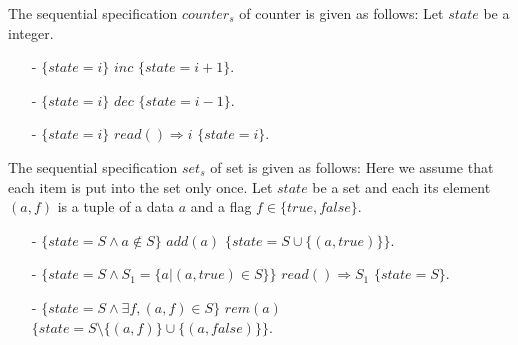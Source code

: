 {\begin{example}[Counter]
\label{definition:sequential specification of counter}
The sequential specification $\mathit{counter}_s$ of counter is given as follows: Let $\mathit{state}$ be a integer.

\begin{itemize}
\setlength{\itemsep}{0.5pt}
\item[-] $\{ \mathit{state} = i \}$ $\mathit{inc}$ $\{ \mathit{state} = i+1 \}$.
\item[-] $\{ \mathit{state} = i \}$ $\mathit{dec}$ $\{ \mathit{state} = i-1 \}$.
\item[-] $\{ \mathit{state} = i \}$ $\mathit{read}() \Rightarrow i$ $\{ \mathit{state} = i \}$.
\end{itemize}
\end{example}


\begin{example}[Set]
\label{definition:sequential specification of set}
The sequential specification $\mathit{set}_s$ of set is given as follows: Here we assume that each item is put into the set only once. Let $\mathit{state}$ be a set and each its element $(a,f)$ is a tuple of a data $a$ and a flag $f \in \{ \mathit{true},\mathit{false} \}$.

\begin{itemize}
\setlength{\itemsep}{0.5pt}
\item[-] $\{ \mathit{state} = S \wedge a \notin S \}$ $\mathit{add}(a)$ $\{ \mathit{state} = S \cup \{ (a,\mathit{true}) \} \}$.
\item[-] $\{ \mathit{state} = S \wedge S_1 = \{a \vert (a,\mathit{true}) \in S \} \}$ $\mathit{read}() \Rightarrow S_1$ $\{ \mathit{state} = S \}$.
\item[-] $\{ \mathit{state} = S \wedge \exists f, (a,f) \in S \}$ $\mathit{rem}(a)$ $\{ \mathit{state} = S \setminus \{ (a,f) \} \cup \{ (a,\mathit{false}) \} \}$.
\end{itemize}
\end{example}



}
